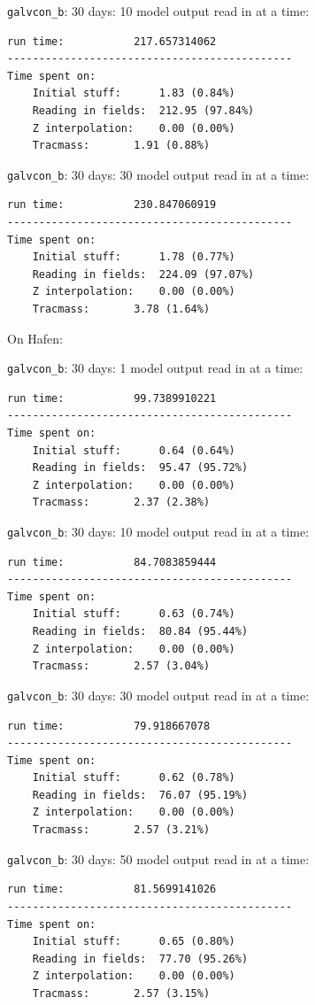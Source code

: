 \documentclass[11pt]{article}
\begin{document}
\verb+galvcon_b+: 30 days: 10 model output read in at a time: \\
\begin{verbatim}
run time:           217.657314062
---------------------------------------------
Time spent on:
    Initial stuff:      1.83 (0.84%)
    Reading in fields:  212.95 (97.84%)
    Z interpolation:    0.00 (0.00%)
    Tracmass:       1.91 (0.88%)
\end{verbatim}

\verb+galvcon_b+: 30 days: 30 model output read in at a time: \\
\begin{verbatim}
run time:           230.847060919
---------------------------------------------
Time spent on:
    Initial stuff:      1.78 (0.77%)
    Reading in fields:  224.09 (97.07%)
    Z interpolation:    0.00 (0.00%)
    Tracmass:       3.78 (1.64%)
\end{verbatim}


On Hafen:

\verb+galvcon_b+: 30 days: 1 model output read in at a time: \\
\begin{verbatim}
run time:           99.7389910221
---------------------------------------------
Time spent on:
    Initial stuff:      0.64 (0.64%)
    Reading in fields:  95.47 (95.72%)
    Z interpolation:    0.00 (0.00%)
    Tracmass:       2.37 (2.38%)
\end{verbatim}

\verb+galvcon_b+: 30 days: 10 model output read in at a time: \\
\begin{verbatim}
run time:           84.7083859444
---------------------------------------------
Time spent on:
    Initial stuff:      0.63 (0.74%)
    Reading in fields:  80.84 (95.44%)
    Z interpolation:    0.00 (0.00%)
    Tracmass:       2.57 (3.04%)
\end{verbatim}

\verb+galvcon_b+: 30 days: 30 model output read in at a time: \\
\begin{verbatim}
run time:           79.918667078
---------------------------------------------
Time spent on:
    Initial stuff:      0.62 (0.78%)
    Reading in fields:  76.07 (95.19%)
    Z interpolation:    0.00 (0.00%)
    Tracmass:       2.57 (3.21%)
\end{verbatim}

\verb+galvcon_b+: 30 days: 50 model output read in at a time: \\
\begin{verbatim}
run time:           81.5699141026
---------------------------------------------
Time spent on:
    Initial stuff:      0.65 (0.80%)
    Reading in fields:  77.70 (95.26%)
    Z interpolation:    0.00 (0.00%)
    Tracmass:       2.57 (3.15%)
\end{verbatim}
\end{document}

